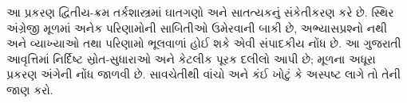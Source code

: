 \documentclass[../../../include/open-logic-chapter]{subfiles}
\begin{document}

\begin{editorial}
આ પ્રકરણ દ્વિતીય-ક્રમ તર્કશાસ્ત્રમાં ઘાતગણો અને સાતત્યકનું
સંકેતીકરણ કરે છે. સ્થિર અંગ્રેજી મૂળમાં અનેક પરિણામોની સાબિતીઓ
ઉમેરવાની બાકી છે, અભ્યાસપ્રશ્નો નથી અને વ્યાખ્યાઓ તથા પરિણામો
ભૂલવાળાં હોઈ શકે એવી સંપાદકીય નોંધ છે. આ ગુજરાતી આવૃત્તિમાં
નિર્દિષ્ટ સ્રોત-સુધારાઓ અને કેટલીક પૂરક દલીલો આપી છે; મૂળના
અધૂરા પ્રકરણ અંગેની નોંધ જાળવી છે. સાવચેતીથી વાંચો અને કંઈ
ખોટું કે અસ્પષ્ટ લાગે તો તેની જાણ કરો.
\end{editorial}





\OLEndChapterHook
\end{document}
